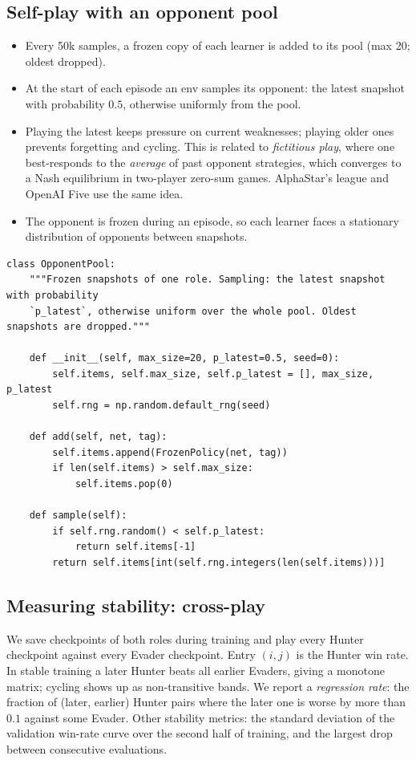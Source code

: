 \documentclass[11pt,a4paper]{article}
\newcommand{\code}[1]{\texttt{#1}}
\begin{document}
\subsection{Self-play with an opponent pool}
\begin{itemize}
  \item Every 50k samples, a frozen copy of each learner is added to its pool (max 20; oldest dropped).
  \item At the start of each episode an env samples its opponent: the latest snapshot with
        probability $0.5$, otherwise uniformly from the pool.
  \item Playing the latest keeps pressure on current weaknesses; playing older ones prevents
        forgetting and cycling. This is related to \emph{fictitious play}, where one best-responds to
        the \emph{average} of past opponent strategies, which converges to a Nash equilibrium in
        two-player zero-sum games. AlphaStar's league and OpenAI Five use the same idea.
  \item The opponent is frozen during an episode, so each learner faces a stationary distribution
        of opponents between snapshots.
\end{itemize}
\begin{lstlisting}[title={\code{rl/pool.py} -- OpponentPool (exact)}]
class OpponentPool:
    """Frozen snapshots of one role. Sampling: the latest snapshot with probability
    `p_latest`, otherwise uniform over the whole pool. Oldest snapshots are dropped."""

    def __init__(self, max_size=20, p_latest=0.5, seed=0):
        self.items, self.max_size, self.p_latest = [], max_size, p_latest
        self.rng = np.random.default_rng(seed)

    def add(self, net, tag):
        self.items.append(FrozenPolicy(net, tag))
        if len(self.items) > self.max_size:
            self.items.pop(0)

    def sample(self):
        if self.rng.random() < self.p_latest:
            return self.items[-1]
        return self.items[int(self.rng.integers(len(self.items)))]
\end{lstlisting}

\subsection{Measuring stability: cross-play}
We save checkpoints of both roles during training and play every Hunter checkpoint against every
Evader checkpoint. Entry $(i,j)$ is the Hunter win rate. In stable training a later Hunter beats
all earlier Evaders, giving a monotone matrix; cycling shows up as non-transitive bands. We
report a \emph{regression rate}: the fraction of (later, earlier) Hunter pairs where the later one
is worse by more than $0.1$ against some Evader. Other stability metrics: the standard deviation of
the validation win-rate curve over the second half of training, and the largest drop between
consecutive evaluations.
\end{document}
